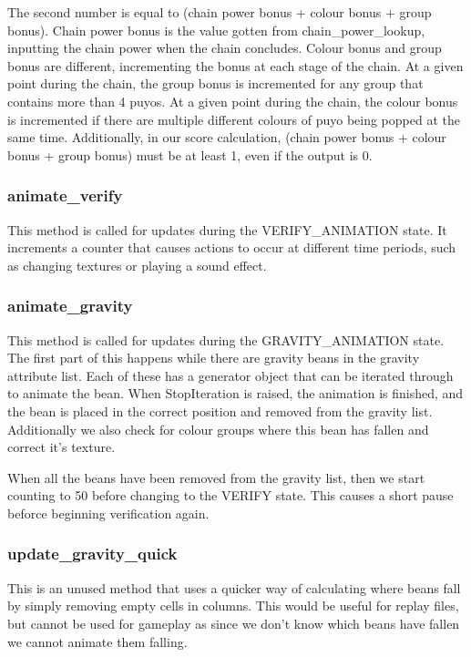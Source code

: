 \documentclass{report}
\begin{document}
The second number is equal to (chain power bonus + colour bonus + group bonus). Chain power bonus is the value gotten from chain\_power\_lookup, inputting the chain power when the chain concludes. Colour bonus and group bonus are different, incrementing the bonus at each stage of the chain. At a given point during the chain, the group bonus is incremented for any group that contains more than 4 puyos. At a given point during the chain, the colour bonus is incremented if there are multiple different colours of puyo being popped at the same time. Additionally, in our score calculation, (chain power bonus + colour bonus + group bonus) must be at least 1, even if the output is 0.

\subsubsection{animate\_verify}

This method is called for updates during the VERIFY\_ANIMATION state. It increments a counter that causes actions to occur at different time periods, such as changing textures or playing a sound effect.

\subsubsection{animate\_gravity}

This method is called for updates during the GRAVITY\_ANIMATION state. The first part of this happens while there are gravity beans in the gravity attribute list. Each of these has a generator object that can be iterated through to animate the bean. When StopIteration is raised, the animation is finished, and the bean is placed in the correct position and removed from the gravity list. Additionally we also check for colour groups where this bean has fallen and correct it's texture.

When all the beans have been removed from the gravity list, then we start counting to 50 before changing to the VERIFY state. This causes a short pause beforce beginning verification again.

\subsubsection{update\_gravity\_quick}

This is an unused method that uses a quicker way of calculating where beans fall by simply removing empty cells in columns. This would be useful for replay files, but cannot be used for gameplay as since we don't know which beans have fallen we cannot animate them falling.
\end{document}
